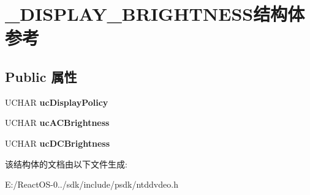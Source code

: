 \hypertarget{struct___d_i_s_p_l_a_y___b_r_i_g_h_t_n_e_s_s}{}\section{\+\_\+\+D\+I\+S\+P\+L\+A\+Y\+\_\+\+B\+R\+I\+G\+H\+T\+N\+E\+S\+S结构体 参考}
\label{struct___d_i_s_p_l_a_y___b_r_i_g_h_t_n_e_s_s}
\subsection*{Public 属性}
\begin{DoxyCompactItemize}
\item 
\mbox{\label{struct___d_i_s_p_l_a_y___b_r_i_g_h_t_n_e_s_s_aaac91e3ffcfc639eb7d096915c801f5d}} 
U\+C\+H\+AR {\bfseries uc\+Display\+Policy}
\item 
\mbox{\label{struct___d_i_s_p_l_a_y___b_r_i_g_h_t_n_e_s_s_aa5d48b5e22219a8214d90eba468942df}} 
U\+C\+H\+AR {\bfseries uc\+A\+C\+Brightness}
\item 
\mbox{\label{struct___d_i_s_p_l_a_y___b_r_i_g_h_t_n_e_s_s_ab4c88ec1f761058e2fc9bef439d372b1}} 
U\+C\+H\+AR {\bfseries uc\+D\+C\+Brightness}
\end{DoxyCompactItemize}


该结构体的文档由以下文件生成\+:\begin{DoxyCompactItemize}
\item 
E\+:/\+React\+O\+S-\/0../sdk/include/psdk/ntddvdeo.\+h\end{DoxyCompactItemize}
